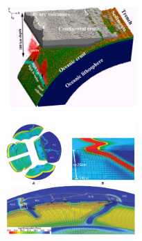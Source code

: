 

\includegraphics[width=5cm]{images/beautiful/zhgt13}
\cite{zhgt13}

\includegraphics[width=5cm]{images/beautiful/stgb10}
\cite{stgb10}
